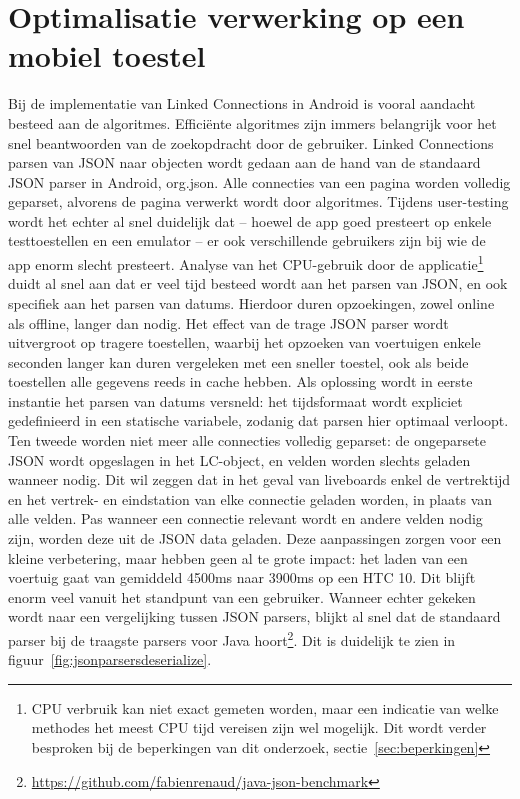 \section{Optimalisatie verwerking op een mobiel toestel}
Bij de implementatie van Linked Connections in Android is vooral aandacht besteed aan de algoritmes. Efficiënte algoritmes zijn immers belangrijk voor het snel beantwoorden van de zoekopdracht door de gebruiker. Linked Connections parsen van JSON naar objecten wordt gedaan aan de hand van de standaard JSON parser in Android, org.json. Alle connecties van een pagina worden volledig geparset, alvorens de pagina verwerkt wordt door algoritmes. 
Tijdens user-testing wordt het echter al snel duidelijk dat -- hoewel de app goed presteert op enkele testtoestellen en een emulator -- er ook verschillende gebruikers zijn bij wie de app enorm slecht presteert. Analyse van het CPU-gebruik door de applicatie\footnote{CPU verbruik kan niet exact gemeten worden, maar een indicatie van welke methodes het meest CPU tijd vereisen zijn wel mogelijk. Dit wordt verder besproken bij de beperkingen van dit onderzoek, sectie~\ref{sec:beperkingen}} duidt al snel aan dat er veel tijd besteed wordt aan het parsen van JSON, en ook specifiek aan het parsen van datums. Hierdoor duren opzoekingen, zowel online als offline, langer dan nodig. Het effect van de trage JSON parser wordt uitvergroot op tragere toestellen, waarbij het opzoeken van voertuigen enkele seconden langer kan duren vergeleken met een sneller toestel, ook als beide toestellen alle gegevens reeds in cache hebben.
Als oplossing wordt in eerste instantie het parsen van datums versneld: het tijdsformaat wordt expliciet gedefinieerd in een statische variabele, zodanig dat parsen hier optimaal verloopt. Ten tweede worden niet meer alle connecties volledig geparset: de ongeparsete JSON wordt opgeslagen in het LC-object, en velden worden slechts geladen wanneer nodig. Dit wil zeggen dat in het geval van liveboards enkel de vertrektijd en het vertrek- en eindstation van elke connectie geladen worden, in plaats van alle velden. Pas wanneer een connectie relevant wordt en andere velden nodig zijn, worden deze uit de JSON data geladen.
Deze aanpassingen zorgen voor een kleine verbetering, maar hebben geen al te grote impact: het laden van een voertuig gaat van gemiddeld 4500ms naar 3900ms op een HTC 10. Dit blijft enorm veel vanuit het standpunt van een gebruiker.
Wanneer echter gekeken wordt naar een vergelijking tussen JSON parsers, blijkt al snel dat de standaard  parser bij de traagste parsers voor Java hoort\footnote{\url{https://github.com/fabienrenaud/java-json-benchmark}}. Dit is duidelijk te zien in figuur~\ref{fig:jsonparsersdeserialize}.

